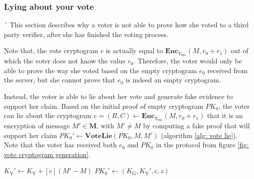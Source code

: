 \subsubsection{Lying about your vote} ´
This section describes why a voter is not able to prove how she voted to a third party verifier, after she has finished the voting process.

Note that, the vote cryptogram $e$ is actually equal to \( \mathbf{Enc}_{Y_\mathrm{enc}} (M, r_0 + r_1) \) out of which the voter does not know the value $r_0$. Therefore, the voter would only be able to prove the way she voted based on the empty cryptogram $e_0$ received from the server, but she cannot prove that $e_0$ is indeed an empty cryptogram. 

Instead, the voter is able to lie about her vote and generate fake evidence to support her claim. Based on the initial proof of empty cryptogram $PK_0$, the voter can lie about the cryptogram \(e = (R, C) \leftarrow \mathbf{Enc}_{Y_\mathrm{enc}} (M, r_0 + r_1) \) that it is an encryption of message \( M' \in \boldsymbol{M} \), with \( M' \neq M \) by computing a fake proof that will support her claim \( PK_0' \leftarrow \mathbf{VoteLie} (PK_0, M, M') \) (algorithm \ref{alg: vote lie}). Note that the voter has received both $e_0$ and $PK_0$ in the protocol from figure \ref{fig: vote cryptogram generation}.

\begin{algorithm}[!h]
\DontPrintSemicolon
    \caption{\( \mathbf{VoteLie} (PK_0, M, M') \)}
    \( K_\mathrm{Y}' \gets K_\mathrm{Y} + [c](M' - M) \) \;
    \( PK_0' \gets (K_\mathrm{G}, K_\mathrm{Y}', c, z) \) \;
     
\end{algorithm}

